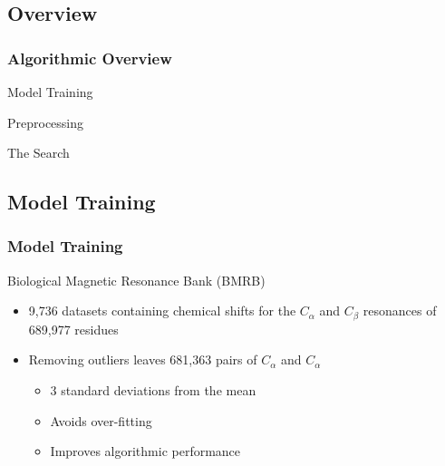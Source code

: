 \documentclass{beamer}
\begin{document}
\subsection{Overview} 
\begin{frame}
	\frametitle{Algorithmic Overview}
	\begin{block}{Model Training}
	\end{block}
	\begin{block}{Preprocessing}
	\end{block}
	\begin{block}{The Search}
	\end{block}
\end{frame}

\subsection{Model Training} 
\begin{frame}
	\frametitle{Model Training}
	\begin{block}{Biological Magnetic Resonance Bank (BMRB) \autocite{biomagresbank}}
		\begin{itemize}
			\item 9,736 datasets containing chemical shifts for the $C_{\alpha}$ and $C_{\beta}$  resonances of 689,977 residues
			\item Removing outliers leaves 681,363 pairs of $C_{\alpha}$ and $C_{\alpha}$
			\begin{itemize}
				\item 3 standard deviations from the mean
				\item Avoids over-fitting
				\item Improves algorithmic performance 
			\end{itemize}
		\end{itemize}
	\end{block}
\end{frame}
\end{document}
